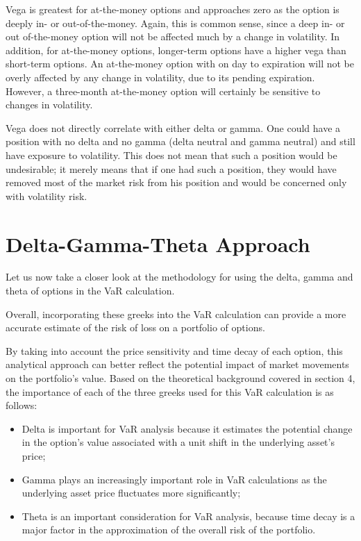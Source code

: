 \documentclass[a4paper, 12pt]{article}
\theoremstyle{definition}
\theoremstyle{plain}
\theoremstyle{definition}
\begin{document}
Vega is greatest for at-the-money options and approaches zero as the option is
deeply in- or out-of-the-money. Again, this is common sense, since a deep in- or out
of-the-money option will not be affected much by a change in volatility. In addition,
for at-the-money options, longer-term options have a higher vega than short-term
options. An at-the-money option with on
day to expiration will not be overly affected by any change in volatility, due to its
pending expiration. However, a three-month at-the-money option will certainly be
sensitive to changes in volatility.

Vega does not directly correlate with either delta or gamma. One could have a
position with no delta and no gamma (delta neutral and gamma neutral) and still have
exposure to volatility. This does not mean that such a position would be undesirable;
it merely means that if one had such a position, they would have removed most of the
market risk from his position and would be concerned only with volatility risk. 

\section{Delta-Gamma-Theta Approach}

Let us now take a closer look 
at the methodology for using  
the delta, gamma and theta of 
options in the VaR calculation. 


Overall, incorporating these greeks into the VaR calculation 
can provide a more accurate estimate of the risk of 
loss on a portfolio of options.

By taking into account the price sensitivity and time 
decay of each option, this analytical approach can better 
reflect the potential impact of market movements on 
the portfolio's value. Based on the theoretical 
background covered in section 4, the importance of 
each of the three greeks used for this VaR calculation is as follows:

\begin{itemize}
    \item Delta is important for VaR analysis 
    because it estimates the potential change 
    in the option's value associated with a 
    unit shift in the underlying asset's price;
    \item Gamma plays an increasingly important role in 
    VaR calculations as the underlying asset price 
    fluctuates more significantly;
    \item Theta is an important consideration for VaR 
    analysis, because time decay is a major factor
    in the approximation of the overall risk of the portfolio.
\end{itemize}
\end{document}
